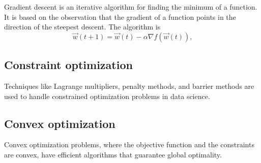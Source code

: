 Gradient descent is an iterative algorithm for finding the minimum of a function.
It is based on the observation that the gradient of a function points in the
direction of the steepest descent.  The algorithm is
\begin{equation}
  \label{eq:gd}
  \vec{w}(t + 1) = \vec{w}(t) - \alpha \nabla f(\vec{w}(t))\text{,}
\end{equation}

\subsection{Constraint optimization}

Techniques like Lagrange multipliers, penalty methods, and barrier methods are used to
handle constrained optimization problems in data science.

\subsection{Convex optimization}

Convex optimization problems, where the objective function and the constraints are convex,
have efficient algorithms that guarantee global optimality.

